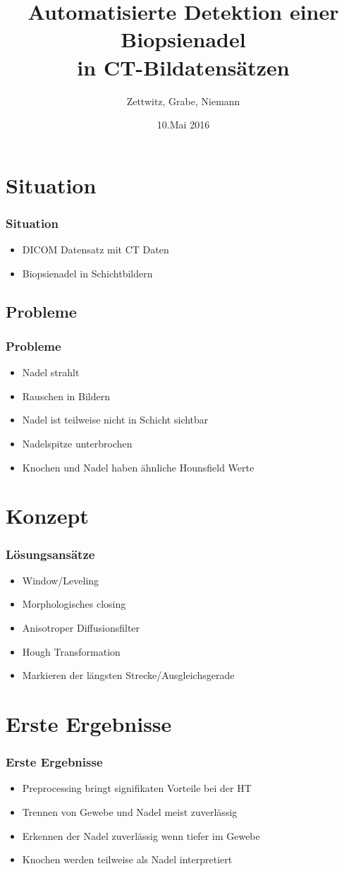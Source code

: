 \documentclass[11pt]{beamer}
\author{Zettwitz, Grabe, Niemann}
\title{Automatisierte Detektion einer Biopsienadel \\ in CT-Bildatensätzen}
\date{10.Mai 2016}
\begin{document}
\begin{frame}
\titlepage
\end{frame}


\section{Situation}
\begin{frame}
\frametitle{Situation}
\begin{itemize} 
\item DICOM Datensatz mit CT Daten
\item Biopsienadel in Schichtbildern
\end{itemize}
\end{frame}



\subsection{Probleme}
\begin{frame}
\frametitle{Probleme}
\begin{itemize}
\item Nadel strahlt
\item Rauschen in Bildern
\item Nadel ist teilweise nicht in Schicht sichtbar
\item Nadelspitze unterbrochen
\item Knochen und Nadel haben ähnliche Hounsfield Werte
\end{itemize}
\end{frame}

\section{Konzept}
\begin{frame}
\frametitle{Lösungsansätze}
\begin{itemize}
\item Window/Leveling
\item Morphologisches closing
\item Anisotroper Diffusionsfilter
\item Hough Transformation
\item Markieren der längsten Strecke/Ausgleichsgerade
\end{itemize}
\end{frame}


\section{Erste Ergebnisse}
\begin{frame}
\frametitle{Erste Ergebnisse}
\begin{itemize}
\item Preprocessing bringt signifikaten Vorteile bei der HT
\item Trennen von Gewebe und Nadel meist zuverlässig
\item Erkennen der Nadel zuverlässig wenn tiefer im Gewebe
\item Knochen werden teilweise als Nadel interpretiert
\end{itemize}
\end{frame}

\end{document}
